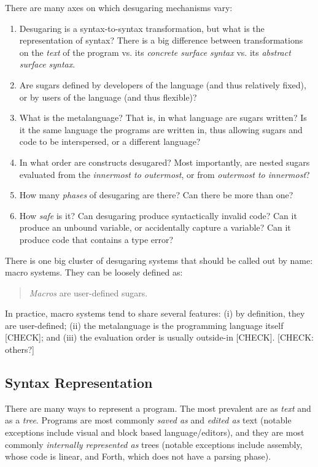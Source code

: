 There are many axes on which desugaring mechanisms vary:
\begin{enumerate}
  \item Desugaring is a syntax-to-syntax transformation, but what is
    the representation of syntax? There is a big difference between
    transformations on the \emph{text} of the program vs. its
    \emph{concrete surface syntax} vs. its \emph{abstract surface
      syntax}.
  \item Are sugars defined by developers of the language (and thus
    relatively fixed), or by users of the language (and thus flexible)? %
  \item What is the metalanguage? That is, in what language are sugars
    written? Is it the same language the programs are written in, thus
    allowing sugars and code to be interspersed, or a different
    language?
  \item In what order are constructs desugared? Most importantly, are
    nested sugars evaluated from the \emph{innermost to outermost}, or
    from \emph{outermost to innermost}?
  \item How many \emph{phases} of desugaring are there? Can there be
    more than one?
  \item How \emph{safe} is it? Can desugaring produce syntactically
    invalid code? Can it produce an unbound variable, or accidentally
    capture a variable? Can it produce code that contains a type error?
\end{enumerate}

There is one big cluster of desugaring systems that should be called
out by name: macro systems. They can be loosely defined as:
\begin{quote}
  \emph{Macros} are user-defined sugars.
\end{quote}
In practice, macro systems tend to share several features: (i) by
definition, they are user-defined; (ii) the metalanguage is the
programming language itself [CHECK]; and (iii) the evaluation order is
usually outside-in [CHECK]. [CHECK: others?]

\subsection{Syntax Representation}

There are many ways to represent a program. The most prevalent are as
\emph{text} and as a \emph{tree}. Programs are most commonly
\emph{saved as} and \emph{edited as} text (notable exceptions include
visual and block based language/editors), and they are most commonly
\emph{internally represented as} trees (notable exceptions include
assembly, whose code is linear, and Forth, which does not have a
parsing phase).


